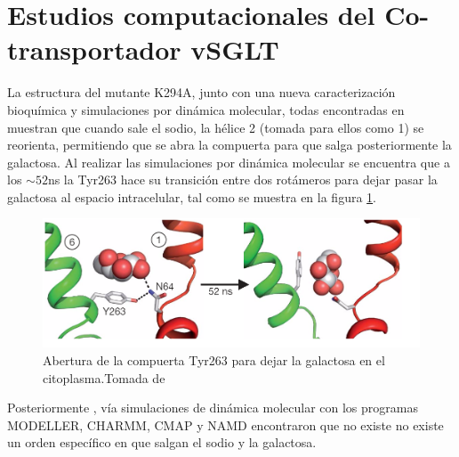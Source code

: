 \section{Estudios computacionales del Co-transportador vSGLT}
La estructura del mutante K294A, junto con una nueva caracterizaci\'{o}n bioqu\'{i}mica y simulaciones por din\'{a}mica molecular, todas encontradas en \cite{Watanabe2010} muestran que cuando sale el sodio, la h\'{e}lice 2 (tomada para ellos como 1) se reorienta, permitiendo que se abra la compuerta para que salga posteriormente la galactosa. Al realizar las simulaciones por din\'{a}mica molecular se encuentra que a los $\sim 52$ns la Tyr263 hace su transici\'{o}n entre dos rot\'{a}meros para dejar pasar la galactosa al espacio intracelular,  tal como se muestra en la figura \ref{fig:Y263}.\\
\begin{figure}[h]
\centering%
\includegraphics[scale=0.5]{Kap3/Y263.png}%
\caption{Abertura de la compuerta Tyr263 para dejar la galactosa en el citoplasma.Tomada de \cite{Watanabe2010}} \label{fig:Y263}
\end{figure}
Posteriormente \cite{Adelman2016}, v\'{i}a simulaciones de din\'{a}mica molecular con los programas MODELLER, CHARMM, CMAP y NAMD encontraron que no existe no existe un orden espec\'{i}fico en que salgan el sodio y la galactosa.